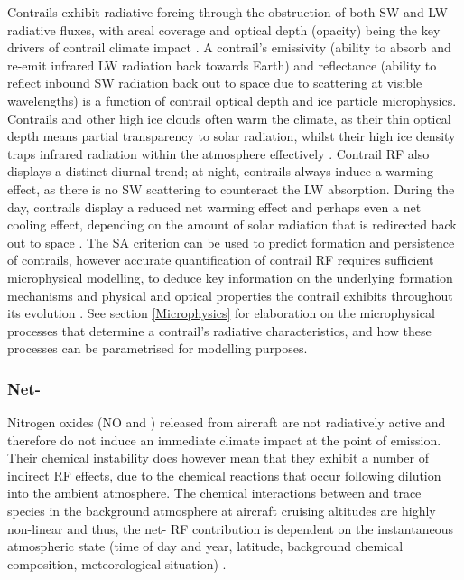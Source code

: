 Contrails exhibit radiative forcing through the obstruction of both SW and LW radiative fluxes, with areal coverage and optical depth (opacity) being the key drivers of contrail climate impact \cite{Schumann2017}. A contrail's emissivity (ability to absorb and re-emit infrared LW radiation back towards Earth) and reflectance (ability to reflect inbound SW radiation back out to space due to scattering at visible wavelengths) is a function of contrail optical depth and ice particle microphysics. Contrails and other high ice clouds often warm the climate, as their thin optical depth means partial transparency to solar radiation, whilst their high ice density traps infrared radiation within the atmosphere effectively \cite{Karcher2018}. Contrail RF also displays a distinct diurnal trend; at night, contrails always induce a warming effect, as there is no SW scattering to counteract the LW absorption. During the day, contrails display a reduced net warming effect and perhaps even a net cooling effect, depending on the amount of solar radiation that is redirected back out to space \cite{Newinger2012}. The SA criterion can be used to predict formation and persistence of contrails, however accurate quantification of contrail RF requires sufficient microphysical modelling, to deduce key information on the underlying formation mechanisms and physical and optical properties the contrail exhibits throughout its evolution \cite{Karcher2015}. See section \ref{Microphysics} for elaboration on the microphysical processes that determine a contrail's radiative characteristics, and how these processes can be parametrised for modelling purposes.


\subsubsection{Net-}
Nitrogen oxides (NO and ) released from aircraft are not radiatively active and therefore do not induce an immediate climate impact at the point of emission. Their chemical instability does however mean that they exhibit a number of indirect RF effects, due to the chemical reactions that occur following dilution into the ambient atmosphere. The chemical interactions between  and trace species in the background atmosphere at aircraft cruising altitudes are highly non-linear and thus, the net- RF contribution is dependent on the instantaneous atmospheric state (time of day and year, latitude, background chemical composition, meteorological situation) \cite{Fritz2020, Kraabol2000b}. 

